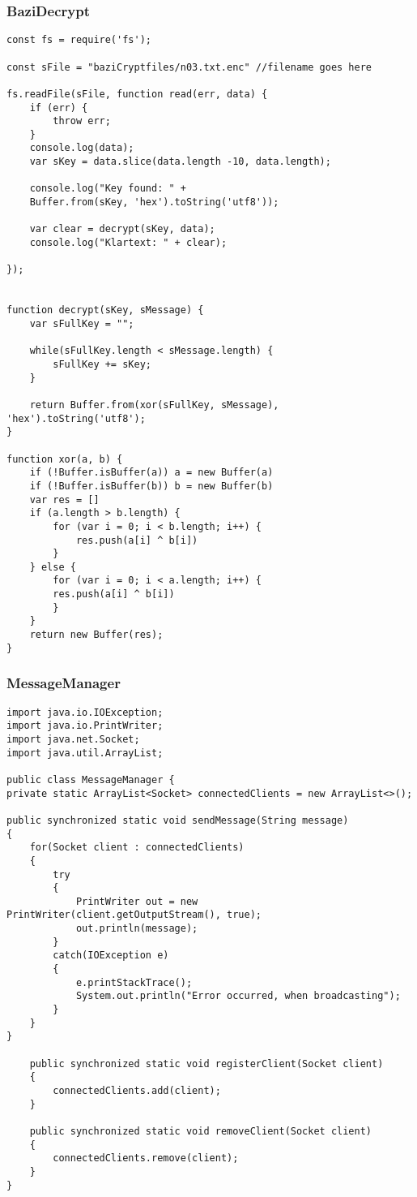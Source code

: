 \documentclass[12pt]{article}
\theoremstyle{plain}
\begin{document}
\subsubsection{BaziDecrypt}
\begin{lstlisting}
const fs = require('fs');

const sFile = "baziCryptfiles/n03.txt.enc" //filename goes here

fs.readFile(sFile, function read(err, data) {
	if (err) {
		throw err;
	}
	console.log(data);
	var sKey = data.slice(data.length -10, data.length);

	console.log("Key found: " +
	Buffer.from(sKey, 'hex').toString('utf8'));

	var clear = decrypt(sKey, data);
	console.log("Klartext: " + clear);

});


function decrypt(sKey, sMessage) {
	var sFullKey = "";

	while(sFullKey.length < sMessage.length) {
		sFullKey += sKey;
	}

	return Buffer.from(xor(sFullKey, sMessage), 'hex').toString('utf8');
}

function xor(a, b) {
	if (!Buffer.isBuffer(a)) a = new Buffer(a)
	if (!Buffer.isBuffer(b)) b = new Buffer(b)
	var res = []
	if (a.length > b.length) {
		for (var i = 0; i < b.length; i++) {
			res.push(a[i] ^ b[i])
		}
	} else {
		for (var i = 0; i < a.length; i++) {
		res.push(a[i] ^ b[i])
		}
	}
	return new Buffer(res);
}
\end{lstlisting}
\subsubsection{MessageManager}
\begin{lstlisting}
import java.io.IOException;
import java.io.PrintWriter;
import java.net.Socket;
import java.util.ArrayList;

public class MessageManager {
private static ArrayList<Socket> connectedClients = new ArrayList<>();

public synchronized static void sendMessage(String message)
{
	for(Socket client : connectedClients)
	{
		try
		{
			PrintWriter out = new PrintWriter(client.getOutputStream(), true);
			out.println(message);
		}
		catch(IOException e)
		{
			e.printStackTrace();
			System.out.println("Error occurred, when broadcasting");
		}
	}
}

	public synchronized static void registerClient(Socket client)
	{
		connectedClients.add(client);
	}

	public synchronized static void removeClient(Socket client)
	{
		connectedClients.remove(client);
	}
}
\end{lstlisting}
\end{document}
